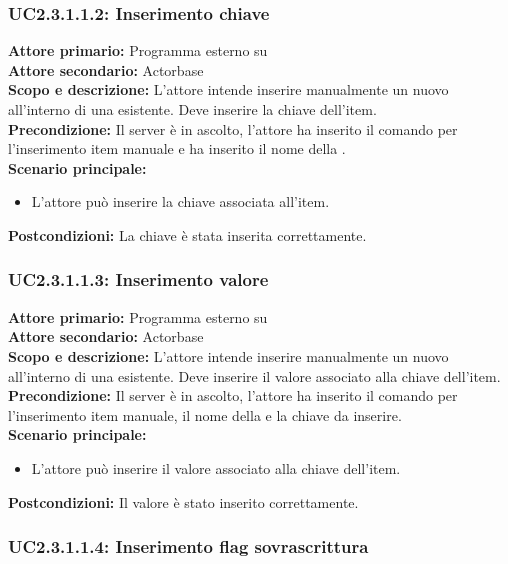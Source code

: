 \documentclass{scalatekids-article}
\begin{document}
\subsubsection{UC2.3.1.1.2: Inserimento chiave}

\textbf{Attore primario:} Programma esterno su \\
\textbf{Attore secondario:} Actorbase\\
\textbf{Scopo e descrizione:} L'attore intende inserire manualmente un nuovo  all'interno di una  esistente. Deve inserire la chiave dell'item.\\
\textbf{Precondizione:} Il server è in ascolto, l'attore ha inserito il comando per l'inserimento item manuale e ha inserito il nome della .\\
\textbf{Scenario principale:}
\begin{itemize}
\item L'attore può inserire la chiave associata all'item.
\end{itemize}
\textbf{Postcondizioni:} La chiave è stata inserita correttamente.

\subsubsection{UC2.3.1.1.3: Inserimento valore}

\textbf{Attore primario:} Programma esterno su \\
\textbf{Attore secondario:} Actorbase\\
\textbf{Scopo e descrizione:} L'attore intende inserire manualmente un nuovo  all'interno di una  esistente. Deve inserire il valore associato alla chiave dell'item.\\
\textbf{Precondizione:} Il server è in ascolto, l'attore ha inserito il comando per l'inserimento item manuale, il nome della  e la chiave da inserire.\\
\textbf{Scenario principale:}
\begin{itemize}
\item L'attore può inserire il valore associato alla chiave dell'item.
\end{itemize}
\textbf{Postcondizioni:} Il valore è stato inserito correttamente.

\subsubsection{UC2.3.1.1.4: Inserimento flag sovrascrittura}
\end{document}
